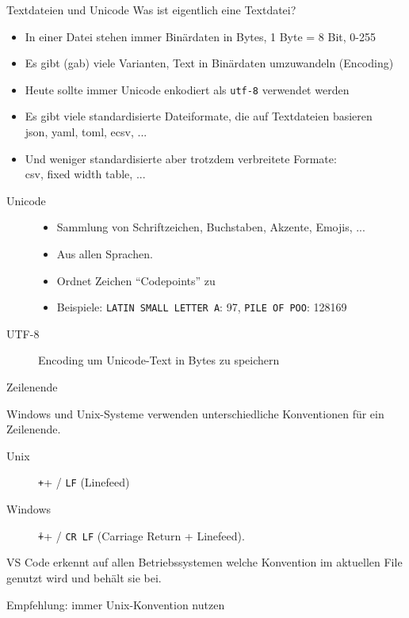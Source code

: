 \begin{frame}[c]{Textdateien und Unicode}
  Was ist eigentlich eine Textdatei?

  \begin{itemize}
    \item In einer Datei stehen immer Binärdaten in Bytes, 1 Byte = 8 Bit, 0-255
    \item Es gibt (gab) viele Varianten, Text in Binärdaten umzuwandeln (Encoding)
    \item Heute sollte immer Unicode enkodiert als \texttt{utf-8} verwendet werden
    \item Es gibt viele standardisierte Dateiformate, die auf Textdateien basieren\\
      json, yaml, toml, ecsv, ...
    \item Und weniger standardisierte aber trotzdem verbreitete Formate: \\
      csv, fixed width table, ...
  \end{itemize}

  \begin{description}
    \item[Unicode]
      \begin{itemize}
        \item Sammlung von Schriftzeichen, Buchstaben, Akzente, Emojis, ...
        \item Aus allen Sprachen.
        \item Ordnet Zeichen \enquote{Codepoints} zu
        \item Beispiele: \texttt{LATIN SMALL LETTER A}: 97, \texttt{PILE OF POO}: 128169
      \end{itemize}
    \item[UTF-8] Encoding um Unicode-Text in Bytes zu speichern
  \end{description}
\end{frame}

\begin{frame}[c]{Zeilenende}

  Windows und Unix-Systeme verwenden unterschiedliche Konventionen für ein Zeilenende.

  \begin{description}
    \item[Unix] \texttt+\n+ / \texttt{LF} (Linefeed)
    \item[Windows] \texttt+\r\n+ / \texttt{CR LF} (Carriage Return + Linefeed).
  \end{description}

  VS Code erkennt auf allen Betriebssystemen welche Konvention im aktuellen File genutzt
  wird und behält sie bei.

  Empfehlung: immer Unix-Konvention nutzen

\end{frame}

